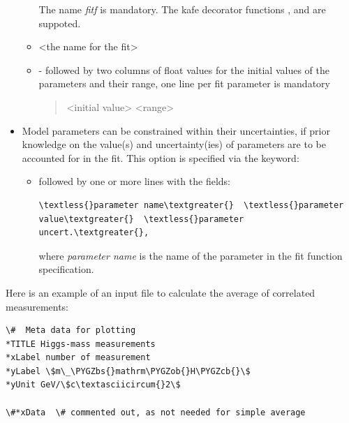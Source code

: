 \documentclass[a4paper,10pt,english]{sphinxmanual}
\def\PYGZbs{\char`\\}
\def\PYGZob{\char`\{}
\def\PYGZcb{\char`\}}
\begin{document}
\begin{fulllineitems}
\begin{itemize}
\begin{itemize}
The name \emph{fitf} is mandatory. The kafe decorator functions
,  and 
are suppoted.

\item {} 
 \textless{}the name for the fit\textgreater{}

\item {} 
 -  followed by two columns of float values
for the initial values of the parameters and their range, one line
per fit parameter is mandatory
\begin{quote}

\textless{}initial value\textgreater{}  \textless{}range\textgreater{}
\end{quote}

\end{itemize}

\item {} 
Model parameters can be constrained within their uncertainties, if prior
knowledge on the value(s) and uncertainty(ies) of parameters are
to be accounted for in the fit. This option is specified via the
keyword:
\begin{itemize}
\item {} 
 followed by one or more lines with
the fields:

\begin{Verbatim}[commandchars=\\\{\}]
\textless{}parameter name\textgreater{}  \textless{}parameter value\textgreater{}  \textless{}parameter uncert.\textgreater{},
\end{Verbatim}

where \emph{parameter name} is the name of the parameter in the fit
function specification.

\end{itemize}

\end{itemize}

Here is an example of an input file to calculate the average
of correlated measurements:

\begin{Verbatim}[commandchars=\\\{\}]
\#  Meta data for plotting
*TITLE Higgs-mass measurements
*xLabel number of measurement
*yLabel \$m\_\PYGZbs{}mathrm\PYGZob{}H\PYGZcb{}\$
*yUnit GeV/\$c\textasciicircum{}2\$

\#*xData  \# commented out, as not needed for simple average


\end{Verbatim}
\end{fulllineitems}
\end{document}
